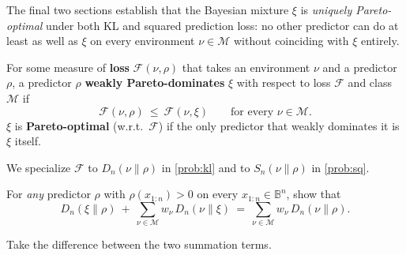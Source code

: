 \documentclass[fontsize=11pt, parskip=half]{scrartcl}
\newcommand{\Mc}{\mathcal{M}}
\newcommand{\Sn}[2]{S_{n}(#1 \parallel #2)}
\begin{document}
The final two sections establish that the Bayesian mixture $\xi$ is
\emph{uniquely Pareto-optimal} under both KL and squared prediction loss:
no other predictor can do at least as well as $\xi$ on every environment
$\nu \in \Mc$ without coinciding with $\xi$ entirely. 


\begin{definition}\label{def:pareto}
For some measure of \textbf{loss} $\mathcal F(\nu, \rho)$ that takes an environment $\nu$ and a
predictor $\rho$, a predictor $\rho$ \textbf{weakly Pareto-dominates} $\xi$  with respect to 
loss $\mathcal{F}$ and class $\mathcal{M}$ if
\[
  \mathcal F(\nu, \rho) ~\leq~ \mathcal F(\nu, \xi)
  \qquad \text{for every } \nu \in \Mc.
\]
$\xi$ is \textbf{Pareto-optimal} (w.r.t.\ $\mathcal F$) if the only predictor
that weakly dominates it is $\xi$ itself.

We specialize $\mathcal F$ to $D_n(\nu \parallel \rho)$ in \cref{prob:kl} 
and to $\Sn{\nu}{\rho}$ in \cref{prob:sq}.
\end{definition}


\begin{exercise}
\label{prob:kl_pythag}



For \emph{any} predictor $\rho$ with $\rho(x_{1:n}) > 0$ on every $x_{1:n} \in \mathbb{B}^n$, show that
\[
  D_n(\xi \parallel \rho) ~+~ \sum_{\nu \in \Mc} w_\nu \, D_n(\nu \parallel \xi)
  ~=~ \sum_{\nu \in \Mc} w_\nu \, D_n(\nu \parallel \rho).
\]


\begin{hint}
Take the difference between the two summation terms.
\end{hint}
\end{exercise}
\end{document}
